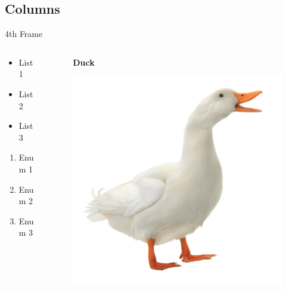 \documentclass[12pt, aspectratio=169, xcolor={table}]{beamer}
\begin{document}
	\subsection{Columns}
	\begin{frame}{4th Frame}
		\begin{columns}
			\begin{column}{0.5\linewidth}
				\begin{itemize}
					\item List 1
					\item List 2
					\item List 3
				\end{itemize}
				\begin{enumerate}
					\item Enum 1
					\item Enum 2
					\item Enum 3
				\end{enumerate}
			\end{column}
			\begin{column}{0.5\linewidth}
				\begin{figure}
    				\centering
    				\textbf{Duck}\par\medskip
    				\includegraphics[scale=0.3]{example-image.png}
				\end{figure}
			\end{column}
		\end{columns}
	\end{frame}
\end{document}
